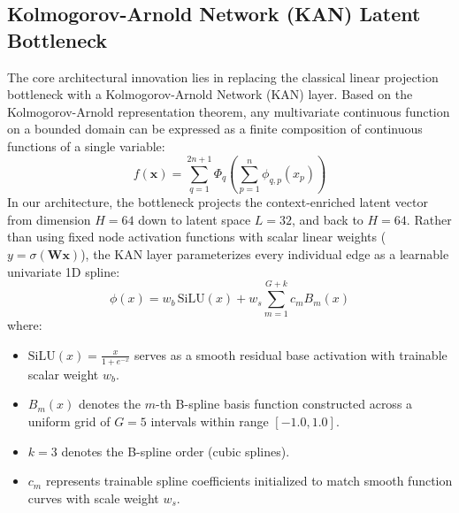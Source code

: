 \documentclass[twocolumn]{article}
\begin{document}
\subsection{Kolmogorov-Arnold Network (KAN) Latent Bottleneck}
The core architectural innovation lies in replacing the classical linear projection bottleneck with a Kolmogorov-Arnold Network (KAN) layer. Based on the Kolmogorov-Arnold representation theorem, any multivariate continuous function on a bounded domain can be expressed as a finite composition of continuous functions of a single variable:
\begin{equation}
    f(\mathbf{x}) = \sum_{q=1}^{2n+1} \Phi_q \left( \sum_{p=1}^n \phi_{q,p}(x_p) \right)
\end{equation}
In our architecture, the bottleneck projects the context-enriched latent vector from dimension $H=64$ down to latent space $L=32$, and back to $H=64$. Rather than using fixed node activation functions with scalar linear weights ($y = \sigma(\mathbf{W}\mathbf{x})$), the KAN layer parameterizes every individual edge as a learnable univariate 1D spline:
\begin{equation}
    \phi(x) = w_b \, \text{SiLU}(x) + w_s \sum_{m=1}^{G+k} c_m B_m(x)
\end{equation}
where:
\begin{itemize}
    \item $\text{SiLU}(x) = \frac{x}{1 + e^{-x}}$ serves as a smooth residual base activation with trainable scalar weight $w_b$.
    \item $B_m(x)$ denotes the $m$-th B-spline basis function constructed across a uniform grid of $G=5$ intervals within range $[-1.0, 1.0]$.
    \item $k=3$ denotes the B-spline order (cubic splines).
    \item $c_m$ represents trainable spline coefficients initialized to match smooth function curves with scale weight $w_s$.
\end{itemize}
\end{document}
